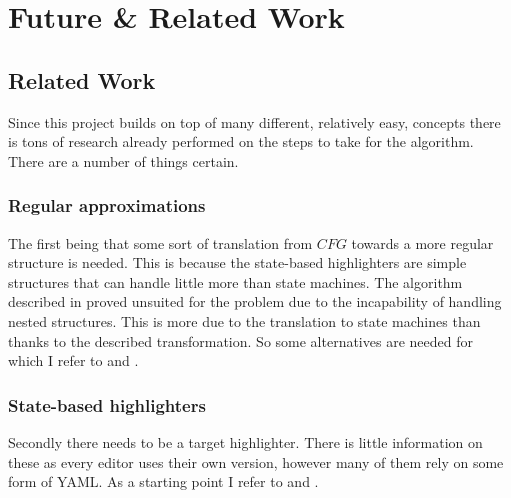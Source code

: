 
\chapter{Future \& Related Work} %

\label{chap:futurework} %


\section{Related Work}
Since this project builds on top of many different, relatively easy, concepts there is tons of research already performed on the steps to take for the algorithm. There are a number of things certain.

\subsection{Regular approximations}
The first being that some sort of translation from $CFG$ towards a more regular structure is needed. This is because the state-based highlighters are simple structures that can handle little more than state machines. The algorithm described in \cite{MohriNederhof} proved unsuited for the problem due to the incapability of handling nested structures. This is more due to the translation to state machines than thanks to the described transformation. So some alternatives are needed for which I refer to \cite{evans1997approximating} and \cite{pereira1991finite}.

\subsection{State-based highlighters}
Secondly there needs to be a target highlighter. There is little information on these as every editor uses their own version, however many of them rely on some form of YAML. As a starting point I refer to \cite{website:SublimeSyntax} and \cite{website:TextmateSyntax}.

\pagebreak
